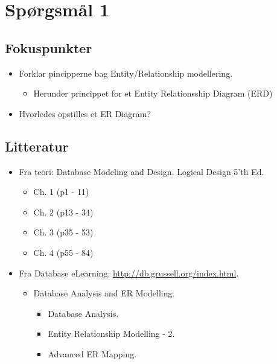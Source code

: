 \section{Spørgsmål 1}

\subsection{Fokuspunkter}
\begin{itemize}
	\item Forklar pincipperne bag Entity/Relationship modellering.
	\begin{itemize}
		\item Herunder princippet for et Entity Relationsship Diagram (ERD)
	\end{itemize}
	\item Hvorledes opstilles et ER Diagram?
\end{itemize}

\subsection{Litteratur}
\begin{itemize}
	
	\item Fra teori: Database Modeling and Design. Logical Design 5'th Ed.
	\begin{itemize}
		\item Ch. 1 (p1 - 11)
		\item Ch. 2 (p13 - 34)
		\item Ch. 3 (p35 - 53)
		\item Ch. 4 (p55 - 84)
	\end{itemize}
	
	\item Fra Database eLearning: \url{http://db.grussell.org/index.html}.
	\begin{itemize}
		\item Database Analysis and ER Modelling.
		\begin{itemize}
			\item Database Analysis.
			\item Entity Relationship Modelling - 2.
			\item Advanced ER Mapping.
		\end{itemize}
	\end{itemize}
	
%	
\end{itemize}

